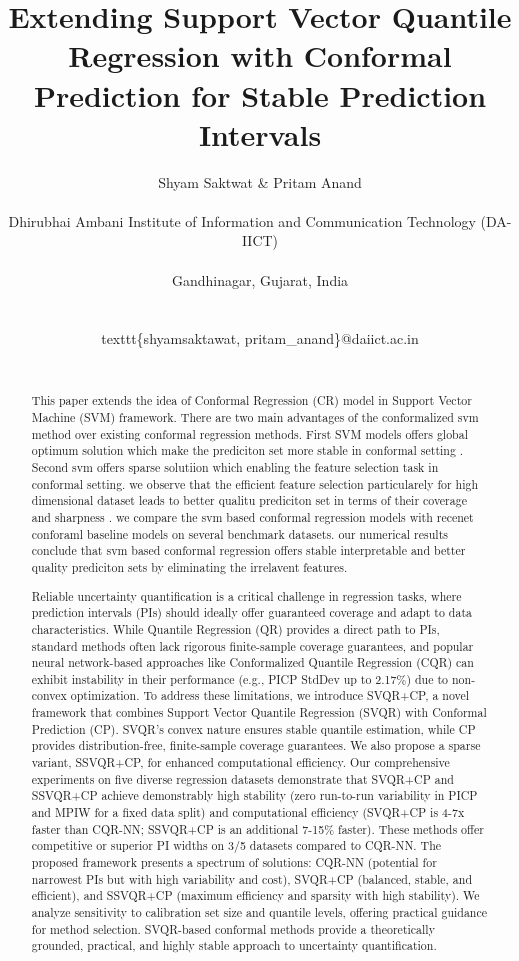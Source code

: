 \documentclass{article}
\title{Extending Support Vector Quantile Regression with Conformal Prediction for Stable Prediction Intervals}
\author{
  Shyam Saktwat \& Pritam Anand \\\\
  Dhirubhai Ambani Institute of Information and Communication Technology (DA-IICT) \\\\
  Gandhinagar, Gujarat, India \\\\
  \\texttt{\{shyamsaktawat, pritam\_anand\}@daiict.ac.in} \\\\
}
\begin{document}
\maketitle

\begin{abstract}
This paper extends the idea of Conformal Regression (CR) model in Support Vector Machine (SVM) framework.  There are two main advantages of the conformalized svm method over existing conformal regression methods. First SVM models offers global optimum solution which make the prediciton set more stable in conformal setting . Second svm offers sparse solutiion which enabling the feature selection task in conformal setting. we observe that the efficient feature selection particularely for high dimensional dataset leads to better qualitu prediciton set in terms of their coverage and sharpness . we compare the svm based conformal regression models with recenet conforaml baseline models on several benchmark datasets. our numerical results conclude that svm based conformal regression offers stable interpretable and better quality prediciton sets by eliminating the irrelavent features.



Reliable uncertainty quantification is a critical challenge in regression tasks, where prediction intervals (PIs) should ideally offer guaranteed coverage and adapt to data characteristics. While Quantile Regression (QR) provides a direct path to PIs, standard methods often lack rigorous finite-sample coverage guarantees, and popular neural network-based approaches like Conformalized Quantile Regression (CQR) can exhibit instability in their performance (e.g., PICP StdDev up to 2.17\%) due to non-convex optimization. To address these limitations, we introduce SVQR+CP, a novel framework that combines Support Vector Quantile Regression (SVQR) with Conformal Prediction (CP). SVQR's convex nature ensures stable quantile estimation, while CP provides distribution-free, finite-sample coverage guarantees. We also propose a sparse variant, SSVQR+CP, for enhanced computational efficiency.
Our comprehensive experiments on five diverse regression datasets demonstrate that SVQR+CP and SSVQR+CP achieve demonstrably high stability (zero run-to-run variability in PICP and MPIW for a fixed data split) and computational efficiency (SVQR+CP is 4-7x faster than CQR-NN; SSVQR+CP is an additional 7-15\% faster). These methods offer competitive or superior PI widths on 3/5 datasets compared to CQR-NN. The proposed framework presents a spectrum of solutions: CQR-NN (potential for narrowest PIs but with high variability and cost), SVQR+CP (balanced, stable, and efficient), and SSVQR+CP (maximum efficiency and sparsity with high stability). We analyze sensitivity to calibration set size and quantile levels, offering practical guidance for method selection. SVQR-based conformal methods provide a theoretically grounded, practical, and highly stable approach to uncertainty quantification.
\end{abstract}
\end{document}
